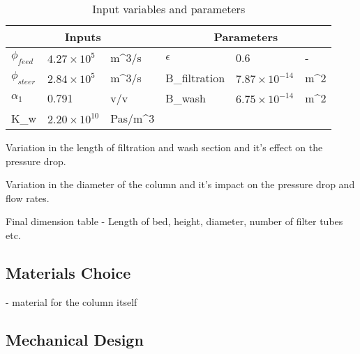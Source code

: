 \begin{table}[]
\caption{Input variables and parameters}
\label{tab:inputsparameters}
\begin{tabular}{llllll}
\hline
\multicolumn{3}{|c|}{Inputs}          & \multicolumn{3}{c|}{Parameters}             \\ \toprule
$\phi_{feed}$  & $4.27\times10^{5}$ & m^{3}/s &
$\epsilon$  & 0.6  & - \\ \hline
$\phi_{steer}$    & $2.84\times10^{5}$ & m^{3}/s &
B_{filtration}  & $7.87\times10^{-14}$ & m^{2} \\ \hline
$\alpha_1$ & 0.791  & v/v &
B_{wash}  & $6.75\times10^{-14}$ & m^{2} \\ \hline
K_{w} &  $2.20\times10^{10}$ & Pas/m^{3}  & &  &  \\ \bottomrule
\end{tabular}
\end{table}





Variation in the length of filtration and wash section and it's effect on the pressure drop. 

Variation in the diameter of the column and it's impact on the pressure drop and flow rates. 

Final dimension table - Length of bed, height, diameter, number of filter tubes etc. 



\subsection{Materials Choice}
- material for the column itself 

\subsection{Mechanical Design}

